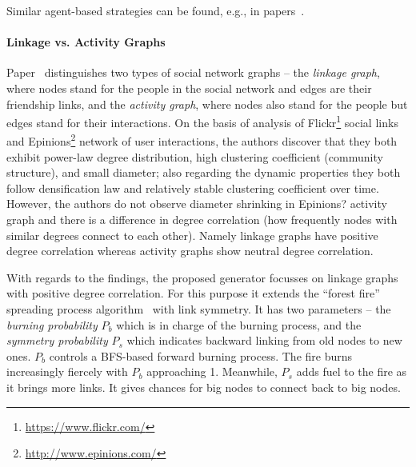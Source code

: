 Similar agent-based strategies can be found, e.g., in papers~\cite{Bernstein:2013:SAS:2499604.2499609}.

\paragraph{Linkage vs. Activity Graphs} Paper~\cite{Yao2011} distinguishes two
types of social network graphs -- the \emph{linkage graph}, where nodes stand
for the people in the social network and edges are their friendship links, and
the \emph{activity graph}, where nodes also stand for the people but edges stand
for their interactions. On the basis of analysis of
Flickr\footnote{\url{https://www.flickr.com/}} social links and
Epinions\footnote{\url{http://www.epinions.com/}} network of user interactions,
the authors discover that they both exhibit power-law degree distribution, high
clustering coefficient (community structure), and small diameter; also regarding
the dynamic properties they both follow densification law and relatively stable
clustering coefficient over time. However, the authors do not observe diameter
shrinking in Epinions? activity graph and there is a difference in degree
correlation (how frequently nodes with similar degrees connect to each other).
Namely linkage graphs have positive degree correlation whereas activity graphs
show neutral degree correlation.

With regards to the findings, the proposed generator focusses on linkage graphs
with positive degree correlation. For this purpose it extends the ``forest
fire'' spreading process algorithm~\cite{Leskovec:2005:GOT:1081870.1081893} with
link symmetry. It has two parameters -- the \emph{burning probability} $P_b$
which is in charge of the burning process, and the \emph{symmetry probability}
$P_s$ which indicates backward linking from old nodes to new ones. $P_b$
controls a BFS-based forward burning process. The fire burns increasingly
fiercely with $P_b$ approaching 1. Meanwhile, $P_s$ adds fuel to the fire as it
brings more links. It gives chances for big nodes to connect back to big nodes.


